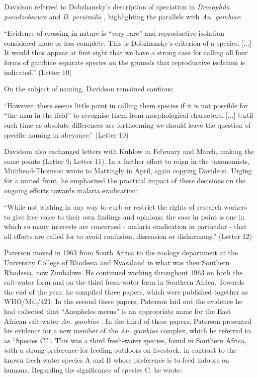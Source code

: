\documentclass[a4paper,11pt,abstracton,hidelinks]{scrartcl}
\begin{document}
Davidson referred to Dobzhansky's description of speciation in \textit{Drosophila pseudoobscura} and \textit{D. persimilis} \citep{Dobzhansky1951}, highlighting the parallels with \textit{An. gambiae}:

\begin{displayquote}
``Evidence of crossing in nature is ``very rare'' and reproductive isolation considered more or less complete. This is Dobzhansky's criterion of a species. [...] It would thus appear at first sight that we have a strong case for calling all four forms of gambiae separate species on the grounds that reproductive isolation is indicated.'' (Letter 10)
\end{displayquote}

On the subject of naming, Davidson remained cautious:

\begin{displayquote}
``However, there seems little point in calling them species if it is not possible for ``the man in the field'' to recognise them from morphological characters. [...] Until such time as absolute differences are forthcoming we should leave the question of specific naming in abeyance.'' (Letter 10)
\end{displayquote}


Davidson also exchanged letters with Kuhlow in February and March, making the same points (Letter 9; Letter 11). In a further effort to reign in the taxonomists, Muirhead-Thomson wrote to Mattingly in April, again copying Davidson. Urging for a united front, he emphasized the practical impact of these decisions on the ongoing efforts towards malaria eradication:


\begin{displayquote}
``While not wishing in any way to curb or restrict the rights of research workers to give free voice to their own findings and opinions, the case in point is one in which so many interests are concerned - malaria eradication in particular - that all efforts are called for to avoid confusion, dissension or disharmony.'' (Letter 12)
\end{displayquote}


Paterson moved in 1963 from South Africa to the zoology department at the University College of Rhodesia and Nyasaland in what was then Southern Rhodesia, now Zimbabwe. He continued working throughout 1963 on both the salt-water form and on the third fresh-water form in Southern Africa. Towards the end of the year, he compiled three papers, which were published together as WHO/Mal/421. In the second these papers, Paterson laid out the evidence he had collected that ``Anopheles merus'' is an appropriate name for the East African salt-water \textit{An. gambiae} \citep{Paterson1963a}. In the third of these papers, Paterson presented his evidence for a new member of the \textit{An. gambiae} complex, which he referred to as ``Species C'' \citep{Paterson1963b}. This was a third fresh-water species, found in Southern Africa, with a strong preference for feeding outdoors on livestock, in contrast to the known fresh-water species A and B whose preference is to feed indoors on humans. Regarding the significance of species C, he wrote:
\end{document}
